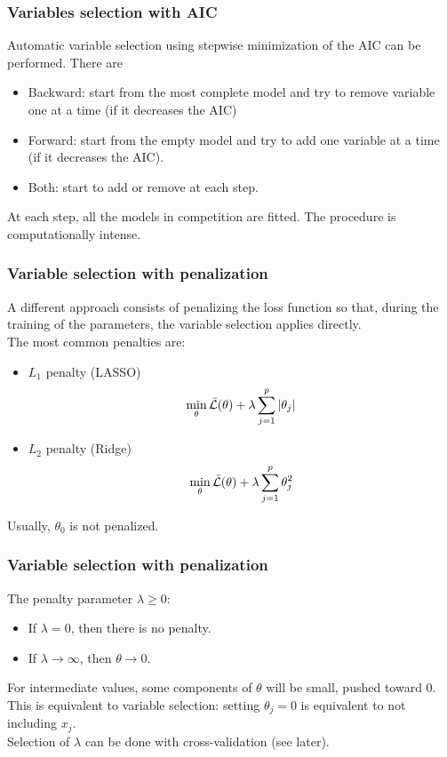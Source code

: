 \begin{frame}
\frametitle{Variables selection with AIC}
Automatic variable selection using stepwise minimization of the AIC can be performed. There are 
\begin{itemize}
\item Backward: start from the most complete model and try to remove variable one at a time (if it decreases the AIC)
\item Forward: start from the empty model and try to add one variable at a time (if it decreases the AIC).
\item Both: start to add or remove at each step.
\end{itemize}
At each step, all the models in competition are fitted. The procedure is computationally intense.
\end{frame}
\begin{frame}
\frametitle{Variable selection with penalization}
A different approach consists of penalizing the loss function so that, during the training of the parameters, the variable selection applies directly.\\
\vspace{0.3cm}
The most common penalties are:
\begin{itemize}
\item $L_1$ penalty (LASSO)
$$
\min_\theta \bar{\cal L}(\theta) + \lambda \sum_{j=1}^p \vert \theta_j \vert
$$
\item $L_2$ penalty (Ridge)
$$
\displaystyle \min_\theta \bar{\cal L}(\theta) + \lambda \sum_{j=1}^p \theta_j^2
$$
\end{itemize} 
Usually, $\theta_0$ is not penalized. 
\end{frame}
\begin{frame}
\frametitle{Variable selection with penalization}
The penalty parameter $\lambda \geq 0$:
\begin{itemize}
\item If $\lambda =0$, then there is no penalty.
\item If $\lambda \longrightarrow \infty$, then $\theta \longrightarrow 0$.
\end{itemize}
For intermediate values, some components of $\theta$ will be small, pushed toward $0$.\\ \vspace{0.3cm}
This is equivalent to variable selection: setting $\theta_j=0$ is equivalent to not including $x_j$.\\
\vspace{0.3cm}
Selection of $\lambda$ can be done with cross-validation (see later).
\end{frame}
